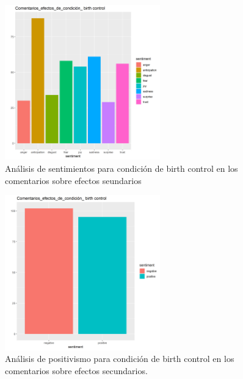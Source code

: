 \documentclass[spanish,]{article}
\begin{document}
\begin{figure}[h]
    \centering
    \includegraphics[width=0.6\textwidth]{figuras/sentimientos/Bbirth1.png}
    \caption{Análisis de sentimientos para condición de birth control en los comentarios sobre efectos seundarios}
    \label{fig:sentimientos:11}
\end{figure}

\begin{figure}[h]
    \centering
    \includegraphics[width=0.6\textwidth]{figuras/sentimientos/Bbirth2.png}
    \caption{Análisis de positivismo para condición de birth control en los comentarios sobre efectos secundarios.}
    \label{fig:sentimientos:12}
\end{figure}
\end{document}
